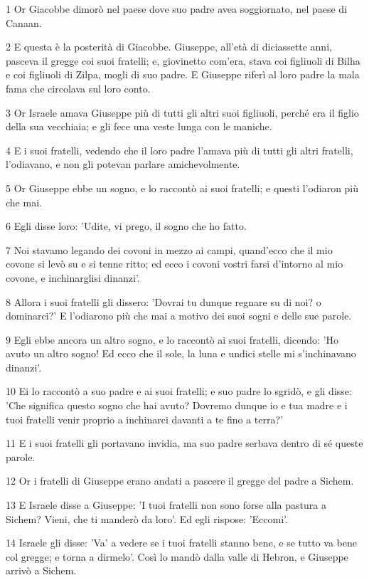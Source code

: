 \par 1 Or Giacobbe dimorò nel paese dove suo padre avea soggiornato, nel paese di Canaan.
\par 2 E questa è la posterità di Giacobbe. Giuseppe, all'età di diciassette anni, pasceva il gregge coi suoi fratelli; e, giovinetto com'era, stava coi figliuoli di Bilha e coi figliuoli di Zilpa, mogli di suo padre. E Giuseppe riferì al loro padre la mala fama che circolava sul loro conto.
\par 3 Or Israele amava Giuseppe più di tutti gli altri suoi figliuoli, perché era il figlio della sua vecchiaia; e gli fece una veste lunga con le maniche.
\par 4 E i suoi fratelli, vedendo che il loro padre l'amava più di tutti gli altri fratelli, l'odiavano, e non gli potevan parlare amichevolmente.
\par 5 Or Giuseppe ebbe un sogno, e lo raccontò ai suoi fratelli; e questi l'odiaron più che mai.
\par 6 Egli disse loro: 'Udite, vi prego, il sogno che ho fatto.
\par 7 Noi stavamo legando dei covoni in mezzo ai campi, quand'ecco che il mio covone si levò su e si tenne ritto; ed ecco i covoni vostri farsi d'intorno al mio covone, e inchinarglisi dinanzi'.
\par 8 Allora i suoi fratelli gli dissero: 'Dovrai tu dunque regnare su di noi? o dominarci?' E l'odiarono più che mai a motivo dei suoi sogni e delle sue parole.
\par 9 Egli ebbe ancora un altro sogno, e lo raccontò ai suoi fratelli, dicendo: 'Ho avuto un altro sogno! Ed ecco che il sole, la luna e undici stelle mi s'inchinavano dinanzi'.
\par 10 Ei lo raccontò a suo padre e ai suoi fratelli; e suo padre lo sgridò, e gli disse: 'Che significa questo sogno che hai avuto? Dovremo dunque io e tua madre e i tuoi fratelli venir proprio a inchinarci davanti a te fino a terra?'
\par 11 E i suoi fratelli gli portavano invidia, ma suo padre serbava dentro di sé queste parole.
\par 12 Or i fratelli di Giuseppe erano andati a pascere il gregge del padre a Sichem.
\par 13 E Israele disse a Giuseppe: 'I tuoi fratelli non sono forse alla pastura a Sichem? Vieni, che ti manderò da loro'. Ed egli rispose: 'Eccomi'.
\par 14 Israele gli disse: 'Va' a vedere se i tuoi fratelli stanno bene, e se tutto va bene col gregge; e torna a dirmelo'. Così lo mandò dalla valle di Hebron, e Giuseppe arrivò a Sichem.
